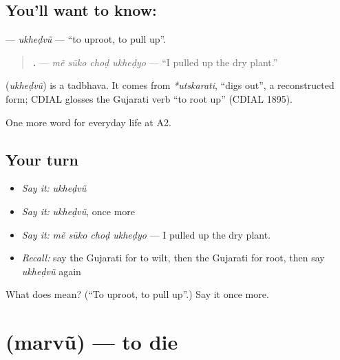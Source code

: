 \subsection*{You'll want to know: }
\textbf{} — \emph{ukheḍvũ} — \textquotedblleft{}to uproot, to pull up\textquotedblright{}.

\begin{quote}
\textbf{   .} — \emph{mẽ sūko choḍ ukheḍyo} — \textquotedblleft{}I pulled up the dry plant.\textquotedblright{}
\end{quote}

\begin{cousinweb}
\textbf{} (\emph{ukheḍvũ}) is a tadbhava. It comes from \emph{*utskarati}, \textquotedblleft{}digs out\textquotedblright{}, a reconstructed form; CDIAL glosses the Gujarati verb \textquotedblleft{}to root up\textquotedblright{} (CDIAL 1895).
\end{cousinweb}

\begin{grammarlens}[title={What you've built}]
One more word for everyday life at A2.
\end{grammarlens}

\subsection*{Your turn}
\begin{itemize}
\raggedright
  \item \emph{Say it:} \emph{ukheḍvũ}
  \item \emph{Say it:} \emph{ukheḍvũ}, once more
  \item \emph{Say it:} \emph{mẽ sūko choḍ ukheḍyo} — I pulled up the dry plant.
  \item \emph{Recall:} say the Gujarati for to wilt, then the Gujarati for root, then say \emph{ukheḍvũ} again
\end{itemize}

\begin{tcolorbox}[breakable,colback=teal!4,colframe=teal!35!black,title={Before you move on}]
What does  mean? (\textquotedblleft{}To uproot, to pull up\textquotedblright{}.) Say it once more.
\end{tcolorbox}
\section[\texorpdfstring{\gu{મરવું} (marvũ)}{મરવું (marvũ)}]{ (marvũ) — to die}

